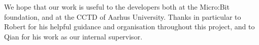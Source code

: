 \documentclass{article}
\begin{document}
We hope that our work is useful to the developers both at the Micro:Bit foundation, and at the CCTD of Aarhus University. Thanks in particular to Robert for his helpful guidance and organisation throughout this project, and to Qian for his work as our internal supervisor.


\raggedright
\end{document}
